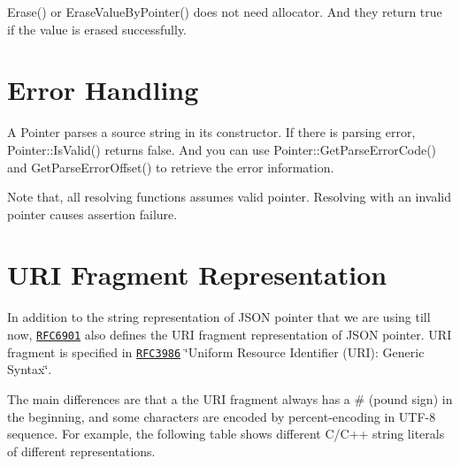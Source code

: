 {\ttfamily Erase()} or {\ttfamily Erase\+Value\+By\+Pointer()} does not need allocator. And they return {\ttfamily true} if the value is erased successfully.\hypertarget{md_Commun_Externe_RapidJSON_doc_pointer_ErrorHandling}{}\section{Error Handling}\label{md_Commun_Externe_RapidJSON_doc_pointer_ErrorHandling}
A {\ttfamily Pointer} parses a source string in its constructor. If there is parsing error, {\ttfamily Pointer\+::\+Is\+Valid()} returns false. And you can use {\ttfamily Pointer\+::\+Get\+Parse\+Error\+Code()} and {\ttfamily Get\+Parse\+Error\+Offset()} to retrieve the error information.

Note that, all resolving functions assumes valid pointer. Resolving with an invalid pointer causes assertion failure.\hypertarget{md_Commun_Externe_RapidJSON_doc_pointer_URIFragment}{}\section{U\+R\+I Fragment Representation}\label{md_Commun_Externe_RapidJSON_doc_pointer_URIFragment}
In addition to the string representation of J\+S\+ON pointer that we are using till now, \href{https://tools.ietf.org/html/rfc6901}{\tt R\+F\+C6901} also defines the U\+RI fragment representation of J\+S\+ON pointer. U\+RI fragment is specified in \href{https://tools.ietf.org/html/rfc3986}{\tt R\+F\+C3986} \char`\"{}\+Uniform Resource Identifier (\+U\+R\+I)\+: Generic Syntax\char`\"{}.

The main differences are that a the U\+RI fragment always has a {\ttfamily \#} (pound sign) in the beginning, and some characters are encoded by percent-\/encoding in U\+T\+F-\/8 sequence. For example, the following table shows different C/\+C++ string literals of different representations.

